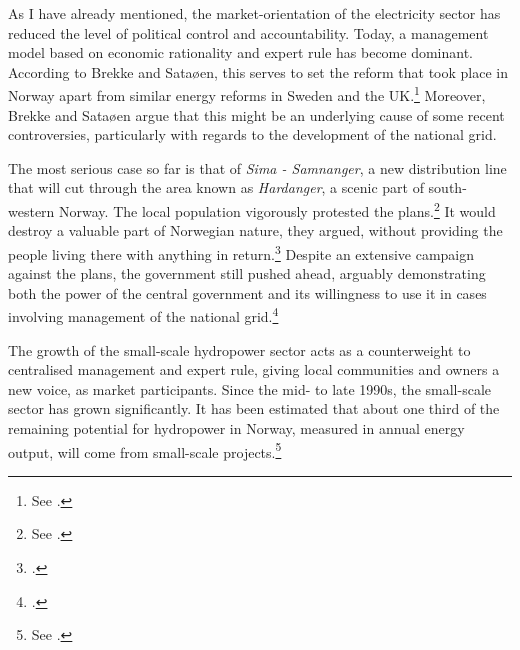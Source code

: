 
As I have already mentioned, the market-orientation of the electricity sector has reduced the level of political control and accountability. Today, a management model based on economic rationality and expert rule has become dominant. According to Brekke and Sataøen, this serves to set the reform that took place in Norway apart from similar energy reforms in Sweden and the UK.\footnote{See \cite{brekke12}.} Moreover, Brekke and Sataøen argue that this might be an underlying cause of some recent controversies, particularly with regards to the development of the national grid. 

The most serious case so far is that of {\it Sima - Samnanger}, a new distribution line that will cut through the area known as {\it Hardanger}, a scenic part of south-western Norway. The local population vigorously protested the plans.\footnote{See \cite[22-23]{brekke12}.} It would destroy a valuable part of Norwegian nature, they argued, without providing the people living there with anything in return.\footcite[26-27]{brekke12} Despite an extensive campaign against the plans, the government still pushed ahead, arguably demonstrating both the power of the central government and its willingness to use it in cases involving  management of the national grid.\footcite[27]{brekke12}

The growth of the small-scale hydropower sector acts as a counterweight to centralised management and expert rule, giving local communities and owners a new voice, as market participants. Since the mid- to late 1990s, the small-scale sector has grown significantly. It has been estimated that about one third of the remaining potential for hydropower in Norway, measured in annual energy output, will come from small-scale projects.\footnote{See \cite[231]{nou129}.}

